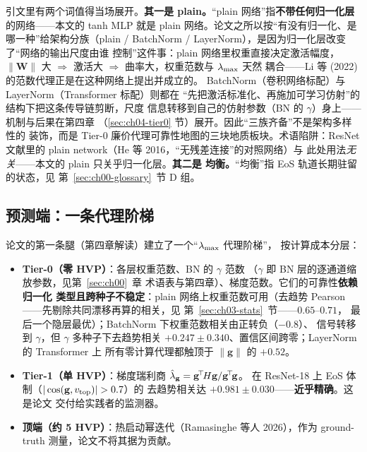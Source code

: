 \noindent 引文里有两个词值得当场展开。\textbf{其一是 plain。}``plain
网络''指\textbf{不带任何归一化层}的网络——本文的 tanh MLP 就是 plain
网络。论文之所以按``有没有归一化、是哪一种''给架构分族（plain /
BatchNorm / LayerNorm），是因为归一化层改变了``网络的输出尺度由谁
控制''这件事：plain 网络里权重直接决定激活幅度，$\|\mathbf{W}\|$ 大
$\Rightarrow$ 激活大 $\Rightarrow$ 曲率大，权重范数与 $\lambda_{\max}$ 天然
耦合——Li 等 (2022) 的范数代理正是在这种网络上提出并成立的。
BatchNorm（卷积网络标配）与 LayerNorm（Transformer 标配）则都在
``先把激活标准化、再施加可学习仿射''的结构下把这条传导链剪断，尺度
信息转移到自己的仿射参数（BN 的 $\gamma$）身上——机制与后果在第四章
（\ref{sec:ch04-tier0} 节）展开。因此``三族齐备''不是架构多样性的
装饰，而是 Tier-0 廉价代理可靠性地图的三块地质板块。术语陷阱：ResNet
文献里的 plain network（He 等 2016，``无残差连接''的对照网络）与
此处用法\emph{无关}——本文的 plain 只关乎归一化层。\textbf{其二是
均衡。}``均衡''指 EoS 轨道长期驻留的状态，见
第~\ref{sec:ch00-glossary}~节 D 组。

\subsection{预测端：一条代理阶梯}\label{sec:ch01-predictors}

论文的第一条腿（第四章解读）建立了一个``$\lambda_{\max}$ 代理阶梯''，
按计算成本分层：

\begin{itemize}
  \item \textbf{Tier-0（零 HVP）}：各层权重范数、BN 的 $\gamma$ 范数
        （$\gamma$ 即 BN 层的逐通道缩放参数，见第~\ref{sec:ch00}~章
        术语表与第四章）、梯度范数。它们的可靠性\textbf{依赖归一化
        类型且跨种子不稳定}：plain 网络上权重范数可用（去趋势
        Pearson——先剔除共同漂移再算的相关，见
        第~\ref{sec:ch03-stats}~节——$0.65$--$0.71$，
        最后一个隐层最优）；BatchNorm 下权重范数相关由正转负（$-0.8$）、
        信号转移到 $\gamma$，但 $\gamma$ 多种子下去趋势相关
        $+0.247\pm0.340$、置信区间跨零；LayerNorm 的 Transformer 上
        所有零计算代理都触顶于 $\|\mathbf{g}\|$ 的 $+0.52$。
  \item \textbf{Tier-1（单 HVP）}：梯度瑞利商
        $\hat{\lambda}_{\mathbf{g}}=\mathbf{g}^{\!\top}\!H\mathbf{g}/\mathbf{g}^{\!\top}\!\mathbf{g}$。
        在 ResNet-18 上 EoS 体制（$|\cos(\mathbf{g},\vtope)|>0.7$）的
        去趋势相关达 $+0.981\pm0.030$——\textbf{近乎精确}。这是论文
        交付给实践者的监测器。
  \item \textbf{顶端（约 5 HVP）}：热启动幂迭代（Ramasinghe 等人
        2026），作为 ground-truth 测量，论文不将其据为贡献。
\end{itemize}

